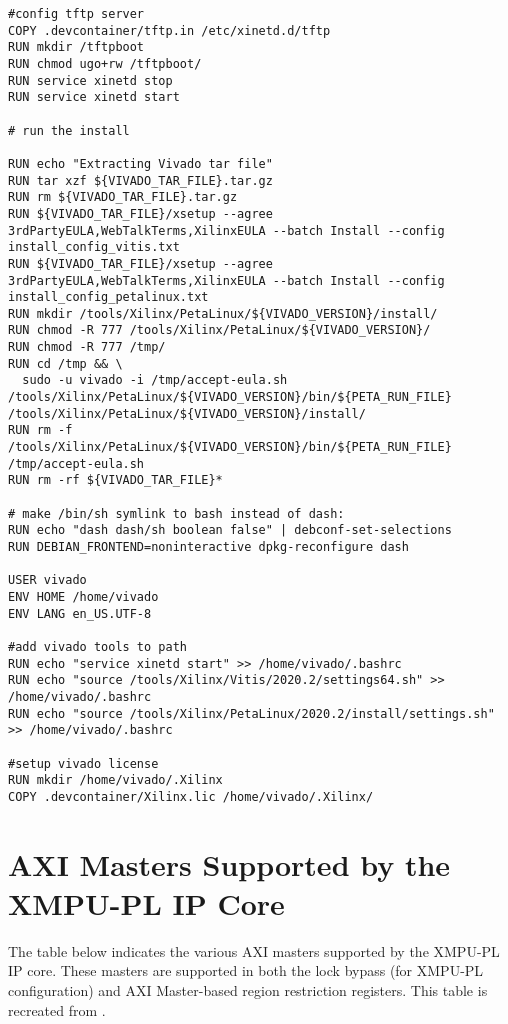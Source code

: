 \begin{lstlisting}[language=docker, breaklines=true, caption={DockerFile for EDF Development Container}, label=lst:Dockerfile]
#config tftp server
COPY .devcontainer/tftp.in /etc/xinetd.d/tftp
RUN mkdir /tftpboot
RUN chmod ugo+rw /tftpboot/
RUN service xinetd stop
RUN service xinetd start

# run the install

RUN echo "Extracting Vivado tar file" 
RUN tar xzf ${VIVADO_TAR_FILE}.tar.gz 
RUN rm ${VIVADO_TAR_FILE}.tar.gz
RUN ${VIVADO_TAR_FILE}/xsetup --agree 3rdPartyEULA,WebTalkTerms,XilinxEULA --batch Install --config install_config_vitis.txt 
RUN ${VIVADO_TAR_FILE}/xsetup --agree 3rdPartyEULA,WebTalkTerms,XilinxEULA --batch Install --config install_config_petalinux.txt
RUN mkdir /tools/Xilinx/PetaLinux/${VIVADO_VERSION}/install/
RUN chmod -R 777 /tools/Xilinx/PetaLinux/${VIVADO_VERSION}/
RUN chmod -R 777 /tmp/
RUN cd /tmp && \
  sudo -u vivado -i /tmp/accept-eula.sh /tools/Xilinx/PetaLinux/${VIVADO_VERSION}/bin/${PETA_RUN_FILE} /tools/Xilinx/PetaLinux/${VIVADO_VERSION}/install/
RUN rm -f /tools/Xilinx/PetaLinux/${VIVADO_VERSION}/bin/${PETA_RUN_FILE} /tmp/accept-eula.sh
RUN rm -rf ${VIVADO_TAR_FILE}*

# make /bin/sh symlink to bash instead of dash:
RUN echo "dash dash/sh boolean false" | debconf-set-selections
RUN DEBIAN_FRONTEND=noninteractive dpkg-reconfigure dash

USER vivado
ENV HOME /home/vivado
ENV LANG en_US.UTF-8

#add vivado tools to path
RUN echo "service xinetd start" >> /home/vivado/.bashrc
RUN echo "source /tools/Xilinx/Vitis/2020.2/settings64.sh" >> /home/vivado/.bashrc
RUN echo "source /tools/Xilinx/PetaLinux/2020.2/install/settings.sh" >> /home/vivado/.bashrc

#setup vivado license
RUN mkdir /home/vivado/.Xilinx
COPY .devcontainer/Xilinx.lic /home/vivado/.Xilinx/
\end{lstlisting}

\chapter{AXI Masters Supported by the XMPU-PL IP Core}\label{apx:axi-masters}
The table below indicates the various AXI masters supported by the XMPU-PL IP core. These masters are supported in both the lock bypass (for XMPU-PL configuration) and AXI Master-based region restriction registers. This table is recreated from \cite{noauthor_memory_2021}.

